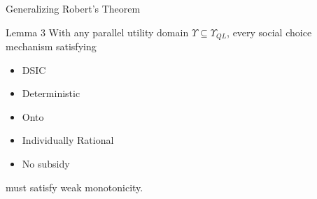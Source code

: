 \begin{frame}{Generalizing Robert's Theorem}
\begin{block}{Lemma 3}
With any parallel utility domain $\Upsilon \subseteq \Upsilon _{QL}$, every social choice mechanism satisfying
\begin{itemize}
    \item DSIC
    \item Deterministic
    \item Onto
    \item Individually Rational
    \item No subsidy
\end{itemize}
must satisfy weak monotonicity.
\end{block}
\end{frame}
